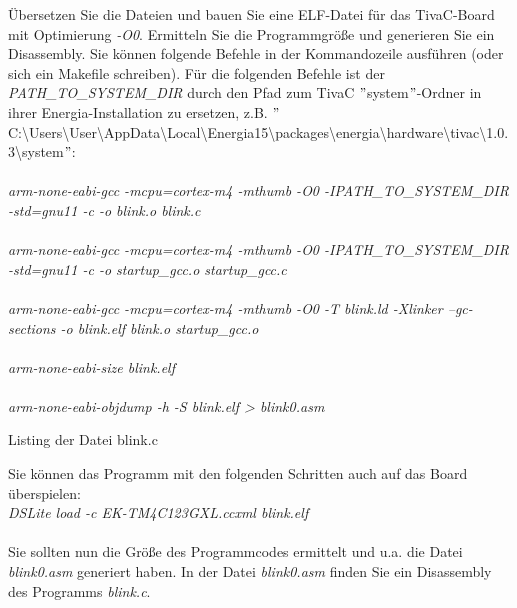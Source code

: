 Übersetzen Sie die Dateien und bauen Sie eine ELF-Datei für das TivaC-Board mit Optimierung \textit{-O0}. Ermitteln Sie die Programmgrö\ss{}e und generieren Sie ein Disassembly. Sie können folgende Befehle in der Kommandozeile ausführen (oder sich ein Makefile schreiben). Für die folgenden Befehle ist der \textit{{PATH\_TO\_SYSTEM\_DIR}} durch den Pfad zum TivaC $"$system$"$-Ordner in ihrer Energia-Installation zu ersetzen, z.B. $"$C:\textbackslash Users\textbackslash User\textbackslash AppData\textbackslash Local\textbackslash Energia15\textbackslash packages\textbackslash energia\textbackslash hardware\textbackslash tivac\textbackslash 1.0.3\textbackslash system$"$:\\ \\
\textit{arm-none-eabi-gcc -mcpu=cortex-m4 -mthumb -O0 -I{PATH\_TO\_SYSTEM\_DIR} -std=gnu11 -c -o blink.o blink.c}\\ \\
\textit{arm-none-eabi-gcc -mcpu=cortex-m4 -mthumb -O0 -I{PATH\_TO\_SYSTEM\_DIR} -std=gnu11 -c -o startup\_gcc.o startup\_gcc.c}\\ \\
\textit{arm-none-eabi-gcc -mcpu=cortex-m4 -mthumb -O0 -T blink.ld -Xlinker --gc-sections -o blink.elf blink.o startup\_gcc.o}\\ \\
\textit{arm-none-eabi-size blink.elf}\\ \\
\textit{arm-none-eabi-objdump -h -S blink.elf > blink0.asm}

\begin{center}
	Listing der Datei blink.c
\end{center}
Sie können das Programm mit den folgenden Schritten auch auf das Board überspielen:\\
\textit{DSLite load -c EK-TM4C123GXL.ccxml blink.elf}\\ \\
Sie sollten nun die Grö\ss{}e des Programmcodes ermittelt und u.a. die Datei \textit{blink0.asm} generiert haben. In der Datei \textit{blink0.asm} finden Sie ein Disassembly des Programms \textit{blink.c}.\\ \\
